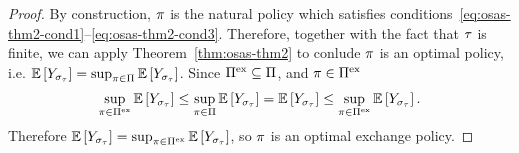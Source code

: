 \begin{proof}
    By construction, $\pi$
    is the natural policy which satisfies conditions~\eqref{eq:osas-thm2-cond1}--\eqref{eq:osas-thm2-cond3}.
    Therefore, together with the fact that $\tau$ is finite, we can apply 
    Theorem~\ref{thm:osas-thm2}
    to conlude $\pi$ is an optimal policy, i.e.
    \(
        \mathbb{E}\left[
            Y_{
                \sigma_{\tau}
            }
        \right]
        =
        \sup_{
            \pi\in
            \Pi
        }
        \mathbb{E}\left[
            Y_{
                \sigma_{\tau}
            }
        \right]
    \).
    Since $\Pi^{\text{ex}}\subseteq\Pi$, and $\pi\in\Pi^{\text{ex}}$ 
    \[
        \sup_{
            \pi\in
            \Pi^{\text{ex}}
        }
        \mathbb{E}\left[
            Y_{
                \sigma_{\tau}
            }
        \right]
        \leq
        \sup_{
            \pi\in
            \Pi
        }
        \mathbb{E}\left[
            Y_{
                \sigma_{\tau}
            }
        \right]
        =
        \mathbb{E}\left[
            Y_{
                \sigma_{\tau}
            }
        \right]
        \leq
        \sup_{
            \pi\in
            \Pi^{\text{ex}}
        }
        \mathbb{E}\left[
            Y_{
                \sigma_{\tau}
            }
        \right] .
    \]
    Therefore
    \(
        \mathbb{E}\left[
            Y_{
                \sigma_{\tau}
            }
        \right]
        =
        \sup_{
            \pi
            \in
            \Pi^{\text{ex}}
        }
        \mathbb{E}\left[
            Y_{
                \sigma_{\tau}
            }
        \right]
    \),
    so $\pi$
    is an optimal exchange policy.


\end{proof}
